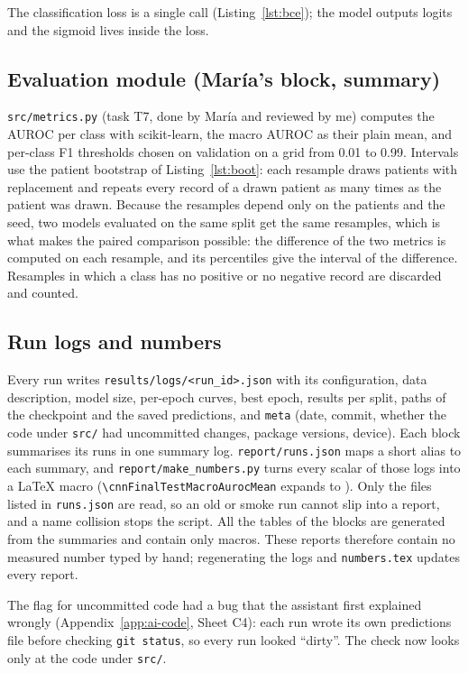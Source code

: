 The classification loss is a single call (Listing~\ref{lst:bce}); the model outputs logits and the
sigmoid lives inside the loss.



\subsection{Evaluation module (Mar\'ia's block, summary)}

\texttt{src/metrics.py} (task T7, done by Mar\'ia and reviewed by me) computes the AUROC per class with
scikit-learn, the macro AUROC as their plain mean, and per-class F1 thresholds chosen on validation on a
grid from 0.01 to 0.99. Intervals use the patient bootstrap of Listing~\ref{lst:boot}: each resample
draws patients with replacement and repeats every record of a drawn patient as many times as the
patient was drawn. Because the resamples depend only on the patients and the seed, two models
evaluated on the same split get the same resamples, which is what makes the paired comparison possible:
the difference of the two metrics is computed on each resample, and its percentiles give the interval
of the difference. Resamples in which a class has no positive or no negative record are discarded and
counted.



\subsection{Run logs and numbers}

Every run writes \texttt{results/logs/<run\_id>.json} with its configuration, data description, model
size, per-epoch curves, best epoch, results per split, paths of the checkpoint and the saved predictions,
and \texttt{meta} (date, commit, whether the code under \texttt{src/} had uncommitted changes,
package versions, device). Each block summarises its runs in one summary log.
\texttt{report/runs.json} maps a short alias to each summary, and \texttt{report/make\_numbers.py}
turns every scalar of those logs into a \LaTeX{} macro (\texttt{\textbackslash cnnFinalTestMacroAurocMean}
expands to \cnnFinalTestMacroAurocMean{}). Only the files listed in \texttt{runs.json} are read, so an
old or smoke run cannot slip into a report, and a name collision stops the script. All the tables of the
blocks are generated from the summaries and contain only macros. These reports therefore contain no
measured number typed by hand; regenerating the logs and \texttt{numbers.tex} updates every report.

The flag for uncommitted code had a bug that the assistant first explained wrongly
(Appendix~\ref{app:ai-code}, Sheet C4): each run wrote its own predictions file before checking
\texttt{git status}, so every run looked ``dirty''. The check now looks only at the code under
\texttt{src/}.
